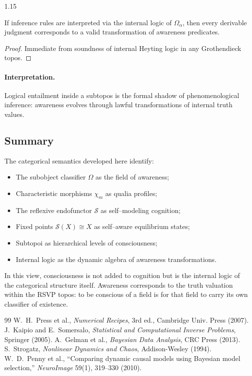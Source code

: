 \documentclass[12pt,a4paper]{article}
\begin{document}
\begin{spacing}{1.15}
\begin{theorem}
\label{thm:soundness}
If inference rules are interpreted
via the internal logic of \(\Omega_{\alpha}\),
then every derivable judgment corresponds
to a valid transformation of awareness predicates.
\end{theorem}

\begin{proof}
Immediate from soundness of internal Heyting logic
in any Grothendieck topos.
\end{proof}

\paragraph{Interpretation.}
Logical entailment inside a subtopos
is the formal shadow of phenomenological inference:
awareness evolves through lawful transformations
of internal truth values.

\subsection{Summary}

The categorical semantics developed here identify:
\begin{itemize}[leftmargin=1.2em]
  \item The subobject classifier \(\Omega\) as the field of awareness;
  \item Characteristic morphisms \(\chi_m\) as qualia profiles;
  \item The reflexive endofunctor \(\mathcal{S}\) as self–modeling cognition;
  \item Fixed points \(\mathcal{S}(X)\cong X\) as self–aware equilibrium states;
  \item Subtopoi as hierarchical levels of consciousness;
  \item Internal logic as the dynamic algebra of awareness transformations.
\end{itemize}

In this view, consciousness is not added to cognition
but is the internal logic of the categorical structure itself.
Awareness corresponds to the truth valuation
within the RSVP topos:
to be conscious of a field
is for that field to carry its own classifier of existence.


\begin{thebibliography}{99}
 W.~H.~Press et al., \emph{Numerical Recipes}, 3rd ed., Cambridge Univ. Press (2007).
 J.~Kaipio and E.~Somersalo, \emph{Statistical and Computational Inverse Problems}, Springer (2005).
 A.~Gelman et al., \emph{Bayesian Data Analysis}, CRC Press (2013).
 S.~Strogatz, \emph{Nonlinear Dynamics and Chaos}, Addison-Wesley (1994).
 W.~D.~Penny et al., ``Comparing dynamic causal models using Bayesian model selection,'' \emph{NeuroImage} 59(1), 319–330 (2010).


\end{thebibliography}
\end{spacing}
\end{document}
